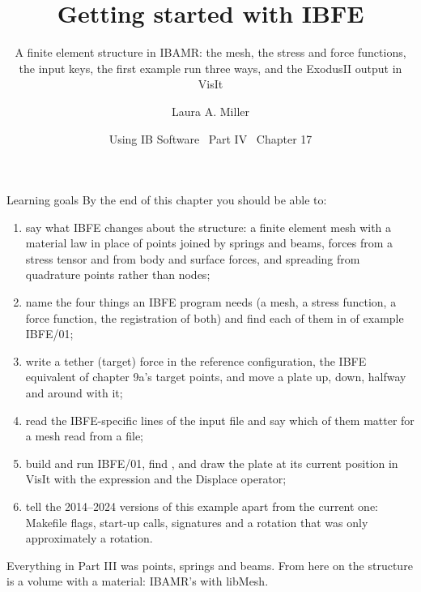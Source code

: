 \documentclass[aspectratio=169,11pt]{beamer}
\title[Getting started with IBFE]{Getting started with IBFE}
\subtitle{A finite element structure in IBAMR: the mesh, the stress and force functions, the input keys, the first example run three ways, and the ExodusII output in VisIt}
\author[Miller]{Laura A. Miller}
\institute[UArizona]{Department of Mathematics, University of Arizona}
\date{Using IB Software \textbullet\ Part IV \textbullet\ Chapter 17}
\begin{document}
\begin{frame}[plain]
\end{frame}

\begin{frame}{Learning goals}
\label{fr:goals}
\footnotesize By the end of this chapter you should be able to:
\begin{enumerate}
  \item say what IBFE changes about the structure: a finite element mesh with a material law in place of points joined by springs and beams, forces from a stress tensor and from body and surface forces, and spreading from quadrature points rather than nodes;
  \item name the four things an IBFE program needs (a mesh, a stress function, a force function, the registration of both) and find each of them in  of example IBFE/01;
  \item write a tether (target) force in the reference configuration, the IBFE equivalent of chapter 9a's target points, and move a plate up, down, halfway and around with it;
  \item read the IBFE-specific lines of the input file and say which of them matter for a mesh read from a file;
  \item build and run IBFE/01, find , and draw the plate at its current position in VisIt with the  expression and the Displace operator;
  \item tell the 2014--2024 versions of this example apart from the current one: Makefile flags, start-up calls, signatures and a rotation that was only approximately a rotation.
\end{enumerate}
\begin{punchbox}
\footnotesize Everything in Part III was points, springs and beams. From here on the structure is a volume with a material: IBAMR's  with libMesh.
\end{punchbox}
\end{frame}
\end{document}
